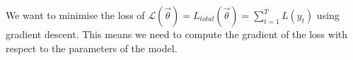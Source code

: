 \documentclass[11pt]{article}
\begin{document}
\begin{figure}[H]
    \centering
\end{figure}

We want to minimise the loss of $\mathcal L(\vec\theta)=L_{total}(\vec \theta)=\sum^T_{t=1}L(y_t)$ using gradient descent. This means we need to compute the gradient of the loss with respect to the parameters of the model.  
\end{document}
